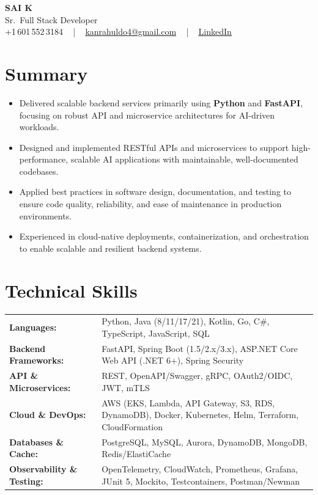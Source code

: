 \documentclass[letterpaper,11pt]{article}
\newcommand{\resumeItem}[1]{
  \item\footnotesize{
    {#1 \vspace{-2pt}}
  }
}
\newcommand{\resumeItemListStart}{\begin{itemize}[leftmargin=*]}
\newcommand{\resumeItemListEnd}{\end{itemize}\vspace{-5pt}}
\begin{document}
\begin{center}
    {\fontsize{14pt}{12pt}\selectfont \textbf{\MakeUppercase{Sai K}}}\\ \vspace{2pt}
    \fontsize{10pt}{12pt}\selectfont Sr.\ Full Stack Developer\\ \vspace{2pt}
    \fontsize{10pt}{12pt}\selectfont +1\,601\,552\,3184 ~ | ~
    \href{mailto:kanrahuldo4@gmail.com}{kanrahuldo4@gmail.com} ~ | ~
    \href{https://www.linkedin.com/in/srrrk/}{\color{blue}\underline{LinkedIn}}
    \vspace{-10pt}
\end{center}

\section{Summary}
\fontsize{9pt}{10pt}\selectfont
\resumeItemListStart
  \resumeItem{Delivered scalable backend services primarily using \textbf{Python} and \textbf{FastAPI}, focusing on robust API and microservice architectures for AI-driven workloads.}
  \resumeItem{Designed and implemented RESTful APIs and microservices to support high-performance, scalable AI applications with maintainable, well-documented codebases.}
  \resumeItem{Applied best practices in software design, documentation, and testing to ensure code quality, reliability, and ease of maintenance in production environments.}
  \resumeItem{Experienced in cloud-native deployments, containerization, and orchestration to enable scalable and resilient backend systems.}
\resumeItemListEnd
\vspace{-6pt}

\section{Technical Skills}
\vspace{-14pt}
\begin{table}[h]
\fontsize{9pt}{10pt}\selectfont
\begin{tabular}{p{0.3\linewidth} p{0.7\linewidth}}
\textbf{Languages:} & Python, Java (8/11/17/21), Kotlin, Go, C\#, TypeScript, JavaScript, SQL \\
\textbf{Backend Frameworks:} & FastAPI, Spring Boot (1.5/2.x/3.x), ASP.NET Core Web API (.NET 6+), Spring Security \\
\textbf{API \& Microservices:} & REST, OpenAPI/Swagger, gRPC, OAuth2/OIDC, JWT, mTLS \\
\textbf{Cloud \& DevOps:} & AWS (EKS, Lambda, API Gateway, S3, RDS, DynamoDB), Docker, Kubernetes, Helm, Terraform, CloudFormation \\
\textbf{Databases \& Cache:} & PostgreSQL, MySQL, Aurora, DynamoDB, MongoDB, Redis/ElastiCache \\
\textbf{Observability \& Testing:} & OpenTelemetry, CloudWatch, Prometheus, Grafana, JUnit 5, Mockito, Testcontainers, Postman/Newman \\
\end{tabular}
\end{table}
\vspace{-15pt}
\end{document}
